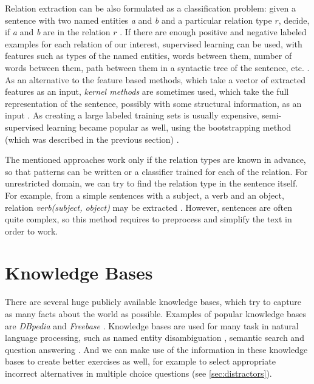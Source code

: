 \documentclass[12pt, twoside]{fithesis2}
\renewcommand{\_}{\leavevmode \kern0.07em\vbox{\hrule width0.4em}}
\newcounter{choice}
\begin{document}

Relation extraction can be also formulated as a classification problem:
given a sentence with two named entities \emph{a} and \emph{b} and a particular relation type $r$,
decide, if \emph{a} and \emph{b} are in the relation $r$ \cite{rel-extract-review}.
If there are enough positive and negative labeled examples for each relation of our interest,
supervised learning can be used, with features such as
types of the named entities, words between them,
number of words between them, path between them in a syntactic tree of the sentence, etc.
\cite{rel-extract-feature-based}.
As an alternative to the feature based methods, which take a vector of extracted features as an input,
\emph{kernel methods} are sometimes used, which take the full representation of the sentence, possibly with some structural information, as an input \cite{rel-extract-kernel}.
As creating a large labeled training sets is usually expensive, semi-supervised learning became popular as well,
using the bootstrapping method (which was described in the previous section) \cite{rel-extract-bootstrapping}.

The mentioned approaches work only if the relation types are known in advance,
so that patterns can be written or a classifier trained for each of the relation.
For unrestricted domain,
we can try to find the relation type in the sentence itself.
For example, from a simple sentences with a subject, a verb and an object,
relation \emph{verb(subject, object)} may be extracted \cite{triples-acquisition}.
However, sentences are often quite complex, so this method requires to preprocess and simplify the text in order to work.

\section{Knowledge Bases}
\label{sec:knowledge-bases}

There are several huge publicly available knowledge bases,
which try to capture as many facts about the world as possible.
Examples of popular knowledge bases are
\textit{DBpedia} \cite{dbpedia}
and \textit{Freebase} \cite{freebase}.
Knowledge bases are used for many task in natural language processing,
such as
named entity disambiguation \cite{dbpedia-spotlight},
semantic search and question answering \cite{watson}.
And we can make use of the information in these knowledge bases to create better exercises as well,
for example to select appropriate incorrect alternatives in multiple choice questions
(see \autoref{sec:distractors}).
\end{document}
